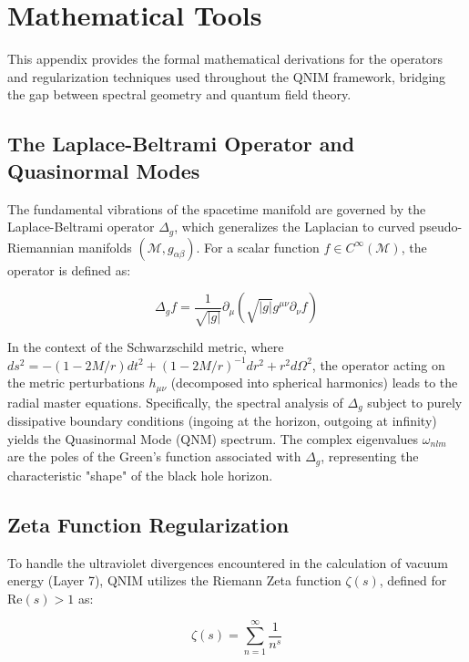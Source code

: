 \documentclass[11pt,a4paper,spanish]{book}
\numberwithin{equation}{chapter}
\numberwithin{figure}{chapter}
\numberwithin{equation}{chapter}
\numberwithin{figure}{chapter}
\numberwithin{table}{chapter}
\begin{document}
\appendix

\chapter{Mathematical Tools}
\label{app:math_tools}

This appendix provides the formal mathematical derivations for the operators and regularization techniques used throughout the QNIM framework, bridging the gap between spectral geometry and quantum field theory.

\section{The Laplace-Beltrami Operator and Quasinormal Modes}

The fundamental vibrations of the spacetime manifold are governed by the Laplace-Beltrami operator $\Delta_g$, which generalizes the Laplacian to curved pseudo-Riemannian manifolds $(\mathcal{M}, g_{\alpha\beta})$. For a scalar function $f \in C^\infty(\mathcal{M})$, the operator is defined as:

\begin{equation}
    \Delta_g f = \frac{1}{\sqrt{|g|}} \partial_\mu \left( \sqrt{|g|} g^{\mu\nu} \partial_\nu f \right)
\end{equation}

In the context of the Schwarzschild metric, where $ds^2 = -(1-2M/r)dt^2 + (1-2M/r)^{-1}dr^2 + r^2d\Omega^2$, the operator acting on the metric perturbations $h_{\mu\nu}$ (decomposed into spherical harmonics) leads to the radial master equations. Specifically, the spectral analysis of $\Delta_g$ subject to purely dissipative boundary conditions (ingoing at the horizon, outgoing at infinity) yields the Quasinormal Mode (QNM) spectrum. The complex eigenvalues $\omega_{nlm}$ are the poles of the Green's function associated with $\Delta_g$, representing the characteristic "shape" of the black hole horizon.

\section{Zeta Function Regularization}

To handle the ultraviolet divergences encountered in the calculation of vacuum energy (Layer 7), QNIM utilizes the Riemann Zeta function $\zeta(s)$, defined for $\text{Re}(s) > 1$ as:

\begin{equation}
    \zeta(s) = \sum_{n=1}^\infty \frac{1}{n^s}
\end{equation}
\end{document}
